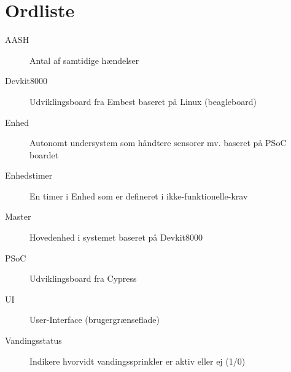 \chapter{Ordliste}


\begin{description}

\item[AASH] Antal af samtidige hændelser
\item[Devkit8000] Udviklingsboard fra Embest baseret på Linux (beagleboard)
\item[Enhed] Autonomt undersystem som håndtere sensorer mv. baseret på PSoC boardet
\item[Enhedstimer] En timer i Enhed som er defineret i ikke-funktionelle-krav
\item[Master] Hovedenhed i systemet baseret på Devkit8000
\item[PSoC] Udviklingsboard fra Cypress
\item[UI] User-Interface (brugergrænseflade)
\item[Vandingsstatus] Indikere hvorvidt vandingssprinkler er aktiv eller ej (1/0)

\end{description}